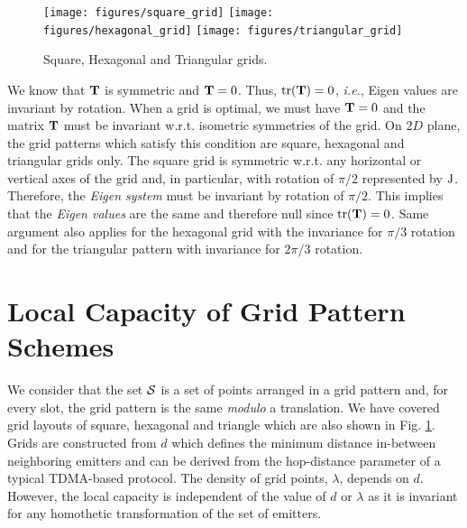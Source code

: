 \documentclass[12pt,english]{article}
\begin{document}
\begin{figure}[!t]
\centering
{}
\texttt{[image: figures/square\_grid]}
\texttt{[image: figures/hexagonal\_grid]}
\texttt{[image: figures/triangular\_grid]}
\caption{Square, Hexagonal and Triangular grids.}
\label{fig:grid_layouts}
\end{figure}

We know that ${\bf T}$ is symmetric and ${\bf T}=0$. Thus, \mbox{$\hbox{\rm tr}({\bf T})=0$}, {\it i.e.}, Eigen values are invariant by rotation. When a grid is optimal, we must have \mbox{${\bf T}=0$} and the matrix ${\bf T}$ must be invariant w.r.t. isometric symmetries of the grid. On $2D$ plane, the grid patterns which satisfy this condition are square, hexagonal and triangular grids only. The square grid is symmetric w.r.t. any horizontal or vertical axes of the grid and, in particular, with rotation of $\pi/2$ represented by $\hbox{J}$. Therefore, the {\em Eigen system} must be invariant by rotation of $\pi/2$. This implies that the {\em Eigen values} are the same and therefore null since \mbox{$\hbox{\rm tr}({\bf T})=0$}. Same argument also applies for the hexagonal grid with the invariance for $\pi/3$ rotation and for the triangular pattern with invariance for $2\pi/3$ rotation. 

\section{Local Capacity of Grid Pattern Schemes}
\label{sec:rx_area_2}

We consider that the set ${\cal S}$ is a set of points arranged in a grid pattern and, for every slot, the grid pattern is the same {\em modulo} a translation. We have covered grid layouts of square, hexagonal and triangle which are also shown in Fig. \ref{fig:grid_layouts}. Grids are constructed from $d$ which defines the minimum distance in-between neighboring emitters and can be derived from the hop-distance parameter of a typical TDMA-based protocol. The density of grid points, $\lambda$, depends on $d$. However, the local capacity is independent of the value of $d$ or $\lambda$ as it is invariant for any homothetic transformation of the set of emitters. 
\end{document}
